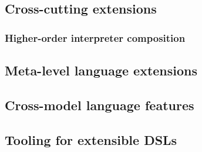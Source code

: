 \subsection{Cross-cutting extensions}

\comments{
  
}

\subsubsection{Higher-order interpreter composition}

\subsection{Meta-level language extensions}

\subsection{Cross-model language features}


\subsection{Tooling for extensible DSLs}





